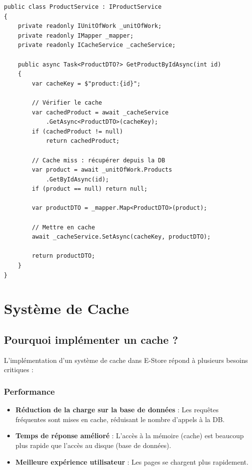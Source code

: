 \documentclass[12pt,a4paper]{article}
\begin{document}
\begin{lstlisting}[caption=ProductService avec cache, float=h!]
public class ProductService : IProductService
{
    private readonly IUnitOfWork _unitOfWork;
    private readonly IMapper _mapper;
    private readonly ICacheService _cacheService;

    public async Task<ProductDTO?> GetProductByIdAsync(int id)
    {
        var cacheKey = $"product:{id}";
        
        // Vérifier le cache
        var cachedProduct = await _cacheService
            .GetAsync<ProductDTO>(cacheKey);
        if (cachedProduct != null)
            return cachedProduct;

        // Cache miss : récupérer depuis la DB
        var product = await _unitOfWork.Products
            .GetByIdAsync(id);
        if (product == null) return null;

        var productDTO = _mapper.Map<ProductDTO>(product);
        
        // Mettre en cache
        await _cacheService.SetAsync(cacheKey, productDTO);
        
        return productDTO;
    }
}
\end{lstlisting}

\section{Système de Cache}

\subsection{Pourquoi implémenter un cache ?}

L'implémentation d'un système de cache dans E-Store répond à plusieurs besoins critiques :

\subsubsection{Performance}

\begin{itemize}
    \item \textbf{Réduction de la charge sur la base de données} : Les requêtes fréquentes sont mises en cache, réduisant le nombre d'appels à la DB.
    \item \textbf{Temps de réponse amélioré} : L'accès à la mémoire (cache) est beaucoup plus rapide que l'accès au disque (base de données).
    \item \textbf{Meilleure expérience utilisateur} : Les pages se chargent plus rapidement.
\end{itemize}
\end{document}
